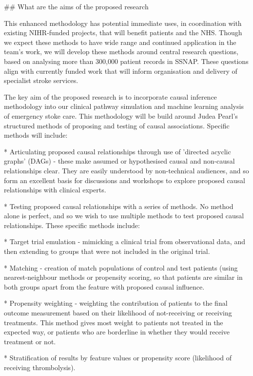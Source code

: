 \begin{markdown}
## What are the aims of the proposed research

This enhanced methodology has potential immediate uses, in coordination with existing NIHR-funded projects, that will benefit patients and the NHS. Though we expect these methods to have wide range and continued application in the team's work, we will develop these methods around central research questions, based on analysing more than 300,000 patient records in SSNAP. These questions align with currently funded work that will inform organisation and delivery of specialist stroke services.

The key aim of the proposed research is to incorporate causal inference methodology into our clinical pathway simulation and machine learning analysis of emergency stoke care. This methodology will be build around Judea Pearl's structured methods of proposing and testing of causal associations. Specific methods will include:

* Articulating proposed causal relationships through use of 'directed acyclic graphs' (DAGs) - these make assumed or hypothesised causal and non-causal relationships clear. They are easily understood by non-technical audiences, and so form an excellent basis for discussions and workshops to explore proposed causal relationships with clinical experts.

* Testing proposed causal relationships with a series of methods. No method alone is perfect, and so we wish to use multiple methods to test proposed causal relationships. These specific methods include:
    
    * Target trial emulation - mimicking a clinical trial from observational data, and then extending to groups that were not included in the original trial.
    
    * Matching - creation of match populations of control and test patients (using nearest-neighbour methods or propensity scoring, so that patients are similar in both groups apart from the feature with proposed causal influence.
    
    * Propensity weighting - weighting the contribution of patients to the final outcome measurement based on their likelihood of not-receiving or receiving treatments. This method gives most weight to patients not treated in the expected way, or patients who are borderline in whether they would receive treatment or not.

    * Stratification of results by feature values or propensity score (likelihood of receiving thrombolysis).
    

\end{markdown}
